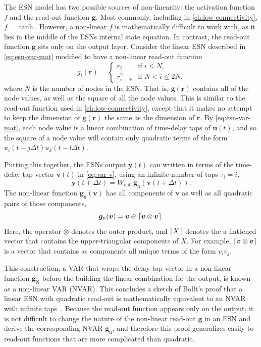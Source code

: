 The ESN model has two possible sources of non-linearity: the
activation function $f$ and the read-out function $\bm{g}$. Most
commonly, including in \cref{ch:low-connectivity}, $f =
\tanh$. However, a non-linear $f$ is mathematically difficult to work
with, as it lies in the middle of the ESNs internal state equation. In
contrast, the read-out function $\bm{g}$ sits only on the output
layer. Consider the linear ESN described in
\cref{eq:esn-var-mat} modified to have a non-linear read-out function
\begin{equation}
  g_i(\bm{r}) = \begin{cases}
    r_i & \text{if } i \leq N, \\
    r_{i - N}^2 & \text{if } N < i \leq 2N.
  \end{cases}
  \label{eq:esn-quadratic-out}
\end{equation}
where $N$ is the number of nodes in the ESN.  That is,
$\bm{g}(\bm{r})$ contains all of the node values, as well as the
square of all the node values. This is similar to the read-out
function used in \cref{ch:low-connectivity}, except that it makes no
attempt to keep the dimension of $\bm{g}(\bm{r})$ the same as the dimension of $\bm{r}$. By
\cref{eq:esn-var-mat}, each node value is a linear combination of
time-delay taps of $\bm{u}(t)$, and so the square of a node value will
contain only quadratic terms of the form $u_i(t-j\Delta
t)u_k(t-l\Delta t)$.

Putting this together, the ESNs output $\bm{y}(t)$ can written in
terms of the time-delay tap vector $\bm{v}(t)$ in \cref{eq:var-v},
using an infinite number of taps $\tau_i = i$,
\begin{equation}
  \bm{y}(t + \Delta t) = W_\text{out}\;\bm{g}_\text{n}\left(\bm{v}(t + \Delta t)\right).
\end{equation}
The non-linear function $\bm{g}_\text{n}(\bm{v})$ has all
components of $\bm{v}$ as well as all quadratic pairs of those components,
\begin{equation}
  \label{eq:quadratic-nvar}
  \bm{g}_\text{n}(\bm{v}) = \bm{v} \oplus \lceil\bm{v} \otimes \bm{v}\rceil.
\end{equation}
Here, the operator $\otimes$ denotes the outer product, and $\lceil X\rceil$
denotes the a flattened vector that contains the upper-triangular
components of $X$. For example, $\lceil\bm{v} \otimes \bm{v}\rceil$ is a
vector that contains as components all unique terms of the form $v_i
v_j$.

This construction, a VAR that wraps the delay tap vector in a
non-linear function $\bm{g}_\text{N}$ before the building the linear
combination for the output, is known as a non-linear VAR (NVAR). This
concludes a sketch of Bollt's proof that a linear ESN with quadratic
read-out is mathematically equivalent to an NVAR with infinite
taps~\cite{bollt2021}. Because the read-out function appears only on
the output, it is not difficult to change the nature of the non-linear
read-out $\bm{g}$ in an ESN and derive the corresponding NVAR $\bm{g}_\text{n}$,
and therefore this proof generalizes easily to read-out functions that are more
complicated than quadratic.

